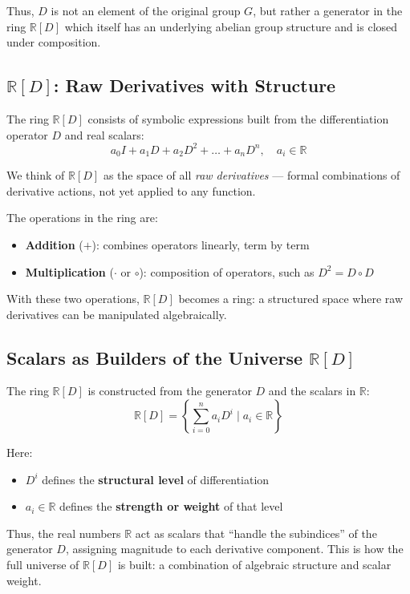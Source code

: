 \documentclass[12pt]{article}
\begin{document}
Thus, $D$ is not an element of the original group $G$, but rather a generator in the ring $\mathbb{R}[D]$ which itself has an underlying abelian group structure and is closed under composition.

\subsection*{\boldmath$\mathbb{R}[D]$: Raw Derivatives with Structure}

The ring $\mathbb{R}[D]$ consists of symbolic expressions built from the differentiation operator $D$ and real scalars:
\[
a_0 I + a_1 D + a_2 D^2 + \dots + a_n D^n, \quad a_i \in \mathbb{R}
\]

We think of $\mathbb{R}[D]$ as the space of all \emph{raw derivatives} — formal combinations of derivative actions, not yet applied to any function.

The operations in the ring are:
\begin{itemize}
	\item \textbf{Addition} ($+$): combines operators linearly, term by term
	\item \textbf{Multiplication} ($\cdot$ or $\circ$): composition of operators, such as $D^2 = D \circ D$
\end{itemize}

With these two operations, $\mathbb{R}[D]$ becomes a ring: a structured space where raw derivatives can be manipulated algebraically.


\subsection*{Scalars as Builders of the Universe \boldmath$\mathbb{R}[D]$}

The ring $\mathbb{R}[D]$ is constructed from the generator $D$ and the scalars in $\mathbb{R}$:
\[
\mathbb{R}[D] = \left\{ \sum_{i=0}^n a_i D^i \mid a_i \in \mathbb{R} \right\}
\]

Here:
\begin{itemize}
	\item $D^i$ defines the \textbf{structural level} of differentiation
	\item $a_i \in \mathbb{R}$ defines the \textbf{strength or weight} of that level
\end{itemize}

Thus, the real numbers $\mathbb{R}$ act as scalars that “handle the subindices” of the generator $D$, assigning magnitude to each derivative component. This is how the full universe of $\mathbb{R}[D]$ is built: a combination of algebraic structure and scalar weight.
\end{document}
